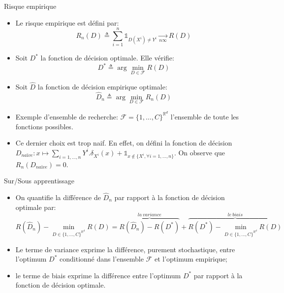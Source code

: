 \documentclass[8pt]{beamer}
\begin{document}
			\begin{frame}{Risque empirique}
				\begin{itemize}
					\item<1-> Le risque empirique est défini par:
						\begin{equation}
							R_n(D) \triangleq \sum_{i=1}^n \mathbb{1}_{D(X^i) \neq Y^i} \underset{n\infty}{\longrightarrow} R(D)
						\end{equation}
					\item<2-> Soit \(D^*\) la fonction de décision optimale. Elle vérifie:
						\begin{equation}
							D^* \triangleq \arg\min_{D \in \mathscr{F}} R(D)
						\end{equation}
					\item<3-> Soit \(\widehat D \) la fonction de décision empirique optimale:
						\begin{equation}
							\widehat D_n \triangleq \arg\min_{D \in \mathscr{F}} R_n(D)
						\end{equation}
					\item<3-> Exemple d'ensemble de recherche: \(\mathscr{F} = \{1, \dots, C\}^{\mathbb{R}^d}\) l'ensemble de toute les fonctions possibles.
					\item<4-> Ce dernier choix est trop naif. En effet, on défini la fonction de décision \(D_{naïve}: x \mapsto \sum_{i=1,\dots,n} Y^i . \delta_{X^i}(x) + \mathbb{1}_{x \notin \{X^i, \forall i=1,\dots,n\}}\). On observe que \(R_n(D_{naïve}) = 0\).
				\end{itemize}
			\end{frame}
			\begin{frame}{Sur/Sous apprentissage}
				\begin{itemize}
					\item<1-> On quantifie la différence de \(\widehat D_n \) par rapport à la fonction de décision optimale par:
						\begin{equation}
							R(\widehat D_n) - \min_{D \in \{1, \dots, C\}^{\mathbb{R}^d}} R(D) = \overbrace{R(\widehat D_n) - R(D^*)}^{la\ variance} + \overbrace{R(D^*) - \min_{D \in \{1, \dots, C\}^{\mathbb{R}^d}} R(D)}^{le\ biais}
						\end{equation}
					\item<2-> Le terme de variance exprime la différence, purement stochastique, entre l'optimum \(D^*\) conditionné dans l'ensemble \(\mathscr{F}\) et l'optimum empirique;
					\item<3-> le terme de biais exprime la différence entre l'optimum \(D^*\) par rapport à la fonction de décision optimale.
				\end{itemize}
			\end{frame}
\end{document}
